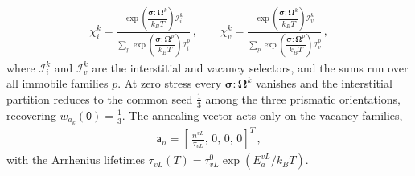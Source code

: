 \documentclass{article}
\newcommand{\spvec}[1]{\bm{\mathsf{#1}}}   %
\begin{document}
\begin{align}\label{eq:SIPN}
\chi^k_i=\frac{\exp\left(\dfrac{\bm\sigma:\bm\Omega^k}{k_BT}\right)\mathcal{I}_i^k}{\sum_p\exp\left(\dfrac{\bm\sigma:\bm\Omega^p}{k_BT}\right)\mathcal{I}_i^p}\, ,\qquad \chi^k_v=\frac{\exp\left(\dfrac{\bm\sigma:\bm\Omega^k}{k_BT}\right)\mathcal{I}_v^k}{\sum_p\exp\left(\dfrac{\bm\sigma:\bm\Omega^p}{k_BT}\right)\mathcal{I}_v^p}\, ,
\end{align}
where $\mathcal{I}_i^k$ and $\mathcal{I}_v^k$ are the interstitial and vacancy selectors, and the sums run over all immobile families $p$. At zero stress every $\bm\sigma:\bm\Omega^k$ vanishes and the interstitial partition reduces to the common seed $\tfrac13$ among the three prismatic orientations, recovering $w_{a_k}(\spvec{0})=\tfrac13$. The annealing vector acts only on the vacancy families,
\begin{align}
\spvec{a}_n=\left[\,\frac{n^{vL}}{\tau_{vL}},\,0,\,0,\,0\right]^T\, ,
\end{align}
with the Arrhenius lifetimes $\tau_{vL}(T)=\tau_{vL}^{0}\exp(E_a^{vL}/k_BT)$.
\end{document}
